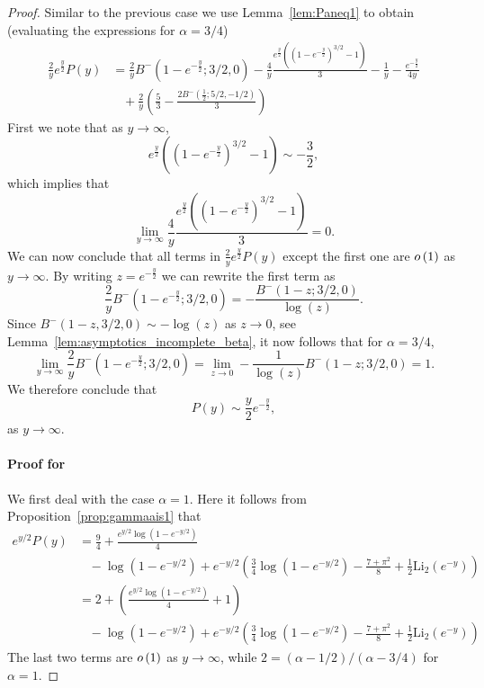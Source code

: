 \begin{proof}
Similar to the previous case we use Lemma~\ref{lem:Paneq1} to obtain (evaluating the expressions for $\alpha = 3/4$)
\begin{align*}
	\frac{2}{y} e^{\frac{y}{2}}P(y) 
	&= \frac{2}{y}B^-(1-e^{-\frac{y}{2}}; 3/2, 0)
		- \frac{4}{y}\frac{e^{\frac{y}{2}}\left((1 - e^{-\frac{y}{2}})^{3/2} - 1\right)}{3}
		- \frac{1}{y} - \frac{ e^{-\frac{y}{2}}}{4 y} \\
	&\hspace{10pt}+ \frac{2}{y} 
		\left(\frac{5}{3} 
		- \frac{2 B^-(\frac{1}{2}; 5/2, -1/2)}{3}\right)
\end{align*}
First we note that as $y \to \infty$,
\begin{equation}\label{eq:asymptotics_Delta_P_auxiliary}
	e^{\frac{y}{2}}\left(\left(1 - e^{-\frac{y}{2}}\right)^{3/2}-1\right) 
	\sim -\frac{3}{2},
\end{equation}
which implies that
\[
	\lim_{y \to \infty} \frac{4}{y}\frac{e^{\frac{y}{2}}\left((1 - e^{-\frac{y}{2}})^{3/2} - 1\right)}{3} = 0.
\]
We can now conclude that all terms in $\frac{2}{y} e^{\frac{y}{2}}P(y)$ except the first one are $o\left(1\right)$ as $y \to \infty$. By writing $z = e^{-\frac{y}{2}}$ we can rewrite the first term as
\[
	\frac{2}{y}B^-(1-e^{-\frac{y}{2}}; 3/2, 0) 
	= -\frac{B^-(1-z; 3/2, 0)}{\log(z)} .
\]
Since $B^-(1-z,3/2,0) \sim - \log(z)$ as $z \to 0$, see Lemma~\ref{lem:asymptotics_incomplete_beta}, it now follows
that for $\alpha = 3/4$,
\[
	\lim_{y \to \infty} \frac{2}{y} B^-(1-e^{-\frac{y}{2}}; 3/2, 0)
	= \lim_{z \to 0} -\frac{1}{\log(z)} B^-(1-z; 3/2, 0) = 1.
\]
We therefore conclude that
\[
	P(y) \sim \frac{y}{2} e^{-\frac{y}{2}},
\]
as $y \to \infty$.

\paragraph{Proof for }
We first deal with the case $\alpha = 1$. Here it follows from Proposition~\ref{prop:gammaais1} that
\begin{align*}
	e^{y/2}P(y) &= \frac{9}{4} + \frac{e^{y/2}\log(1-e^{-y/2})}{4} \\
	&\hspace{10pt}-\log(1-e^{-y/2}) + e^{-y/2}\left(\frac{3}{4}\log(1-e^{-y/2}) - \frac{7 + \pi^2}{8} + 	
		\frac{1}{2}\mathrm{Li}_2(e^{-y})\right) \\
	&= 2 + \left(\frac{e^{y/2}\log(1-e^{-y/2})}{4} + 1\right)\\
	&\hspace{10pt}-\log(1-e^{-y/2}) + e^{-y/2}\left(\frac{3}{4}\log(1-e^{-y/2}) - \frac{7 + \pi^2}{8} + 	
		\frac{1}{2}\mathrm{Li}_2(e^{-y})\right)
\end{align*}
The last two terms are $o\left(1\right)$ as $y \to \infty$, while $2 = (\alpha - 1/2)/(\alpha - 3/4)$ for $\alpha = 1$.


\end{proof}
